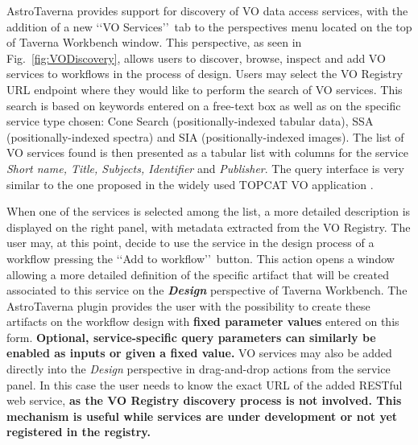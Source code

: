 \documentclass{aa}
\begin{document}
AstroTaverna provides support for discovery of VO data access services, with the addition of a new \lq\lq VO Services\rq\rq\ tab to the perspectives menu located on the top of Taverna Workbench window. This perspective, as seen in Fig.~\ref{fig:VODiscovery}, allows users to discover, browse, inspect and add VO services to workflows in the process of design. Users may select the VO Registry URL endpoint where they would like to perform the search of VO services. This search is based on keywords entered on a free-text box as well as on the specific service type chosen: Cone Search (positionally-indexed tabular data), SSA (positionally-indexed spectra) and SIA (positionally-indexed images). The list of VO services found is then presented as a tabular list with columns for the service \textit{Short name, Title, Subjects, Identifier} and \textit{Publisher}. The query interface is very similar to the one proposed in the widely used TOPCAT VO application \citep{Taylor2011}. 

When one of the services is selected among the list, a more detailed description is displayed on the right panel, with metadata extracted from the VO Registry. The user may, at this point, decide to use the service in the design process of a workflow pressing the \lq\lq Add to workflow\rq\rq\ button. This action opens a window allowing a more detailed definition of the specific artifact that will be created associated to this service on the \textbf{\emph{Design}} perspective of Taverna Workbench. The AstroTaverna plugin provides the user with the possibility to create these artifacts on the workflow design with \textbf{fixed parameter values} entered on this form. \textbf{Optional, service-specific query parameters can similarly be enabled as inputs or given a fixed value.} VO services may also be added directly into the \emph{Design} perspective in drag-and-drop actions from the service panel. In this case the user needs to know the exact URL of the added RESTful web service, \textbf{as the VO Registry discovery process is not involved. This mechanism is useful while services are under development or not yet registered in the registry.}
\end{document}
